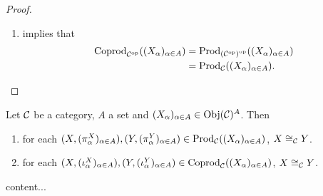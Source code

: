 \documentclass{book}
\begin{document}
\begin{proof}
\begin{enumerate}
\begin{itemize}
				\item {}
			\end{itemize}
			Since $\Prod_{\op{\MC}}((X_{\al})_{\al \in A}) \subset \Coprod_{\MC}((X_{\al})_{\al \in A})$ and $\Coprod_{\MC}((X_{\al})_{\al \in A}) \subset \Prod_{\op{\MC}}((X_{\al})_{\al \in A})$, we have that $\Prod_{\op{\MC}}((X_{\al})_{\al \in A}) = \Coprod_{\MC}((X_{\al})_{\al \in A})$. 
			\item {} implies that 
			\begin{align*}
				\operatorname{Coprod}_{{\mathcal{C}}^{\text{op}}}((X_{\alpha})_{\alpha \in A})
				& = \operatorname{Prod}_{{({\mathcal{C}}^{\text{op}})}^{\text{op}}}((X_{\alpha})_{\alpha \in A}) \\
				& = \operatorname{Prod}_{\mathcal{C}}((X_{\alpha})_{\alpha \in A}).
			\end{align*}
		\end{enumerate}
	\end{proof}
	
\begin{ex}
	Let $\mathcal{C}$ be a category, $A$ a set  and $(X_{\alpha})_{\alpha \in A} \in \operatorname{Obj}(\mathcal{C})^A$. Then 
	\begin{enumerate}
		\item for each $(X, (\pi^X_{\alpha})_{\alpha \in A}), (Y, (\pi^Y_{\alpha})_{\alpha \in A}) \in \operatorname{Prod}_{\mathcal{C}}((X_{\alpha})_{\alpha \in A})$, $X \cong_{\mathcal{C}} Y$. 
		\item for each $(X, (\iota^X_{\alpha})_{\alpha \in A}), (Y, (\iota^Y_{\alpha})_{\alpha \in A}) \in \operatorname{Coprod}_{\mathcal{C}}((X_{\alpha})_{\alpha \in A})$, $X \cong_{\mathcal{C}} Y$. 
	\end{enumerate}
\end{ex}

\begin{ex}
	content...
\end{ex}
	
	
	
	
	
	
	
	
	
	
	
	
	
	
	
	
	
	
	
	
	
	
	
	
	
	
	
	
	
	
	
	
	
	
	
	
	
\end{document}
